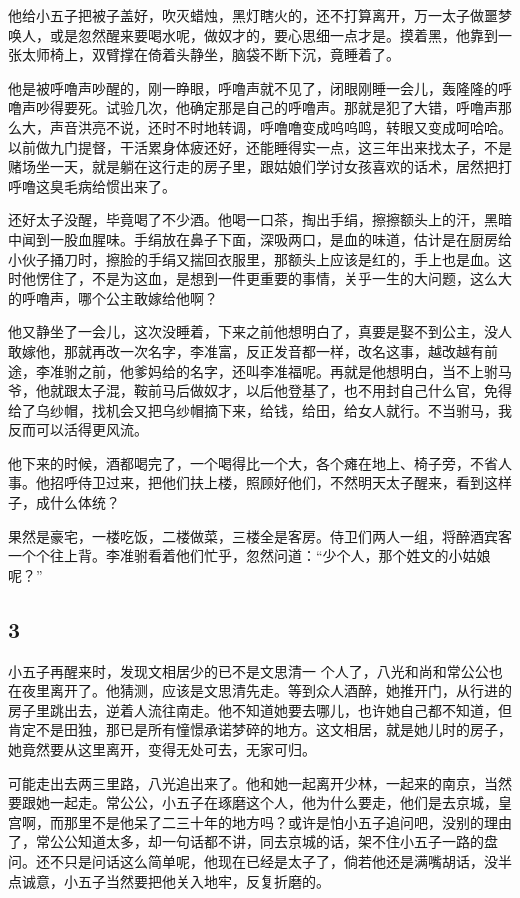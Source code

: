 他给小五子把被子盖好，吹灭蜡烛，黑灯瞎火的，还不打算离开，万一太子做噩梦唤人，或是忽然醒来要喝水呢，做奴才的，要心思细一点才是。摸着黑，他靠到一张太师椅上，双臂撑在倚着头静坐，脑袋不断下沉，竟睡着了。

他是被呼噜声吵醒的，刚一睁眼，呼噜声就不见了，闭眼刚睡一会儿，轰隆隆的呼噜声吵得要死。试验几次，他确定那是自己的呼噜声。那就是犯了大错，呼噜声那么大，声音洪亮不说，还时不时地转调，呼噜噜变成呜呜鸣，转眼又变成呵哈哈。以前做九门提督，干活累身体疲还好，还能睡得实一点，这三年出来找太子，不是赌场坐一天，就是躺在这行走的房子里，跟姑娘们学讨女孩喜欢的话术，居然把打呼噜这臭毛病给惯出来了。

还好太子没醒，毕竟喝了不少酒。他喝一口茶，掏出手绢，擦擦额头上的汗，黑暗中闻到一股血腥味。手绢放在鼻子下面，深吸两口，是血的味道，估计是在厨房给小伙子捅刀时，擦脸的手绢又揣回衣服里，那额头上应该是红的，手上也是血。这时他愣住了，不是为这血，是想到一件更重要的事情，关乎一生的大问题，这么大的呼噜声，哪个公主敢嫁给他啊？

他又静坐了一会儿，这次没睡着，下来之前他想明白了，真要是娶不到公主，没人敢嫁他，那就再改一次名字，李准富，反正发音都一样，改名这事，越改越有前途，李准驸之前，他爹妈给的名字，还叫李准福呢。再就是他想明白，当不上驸马爷，他就跟太子混，鞍前马后做奴才，以后他登基了，也不用封自己什么官，免得给了乌纱帽，找机会又把乌纱帽摘下来，给钱，给田，给女人就行。不当驸马，我反而可以活得更风流。

他下来的时候，酒都喝完了，一个喝得比一个大，各个瘫在地上、椅子旁，不省人事。他招呼侍卫过来，把他们扶上楼，照顾好他们，不然明天太子醒来，看到这样子，成什么体统？

果然是豪宅，一楼吃饭，二楼做菜，三楼全是客房。侍卫们两人一组，将醉酒宾客一个个往上背。李准驸看着他们忙乎，忽然问道：“少个人，那个姓文的小姑娘呢？”
\newline

{\centering\subsection{3}}

小五子再醒来时，发现文相居少的已不是文思清一
个人了，八光和尚和常公公也在夜里离开了。他猜测，应该是文思清先走。等到众人酒醉，她推开门，从行进的房子里跳出去，逆着人流往南走。他不知道她要去哪儿，也许她自己都不知道，但肯定不是田独，那已是所有憧憬承诺梦碎的地方。这文相居，就是她儿时的房子，她竟然要从这里离开，变得无处可去，无家可归。

可能走出去两三里路，八光追出来了。他和她一起离开少林，一起来的南京，当然要跟她一起走。常公公，小五子在琢磨这个人，他为什么要走，他们是去京城，皇宫啊，而那里不是他呆了二三十年的地方吗？或许是怕小五子追问吧，没别的理由了，常公公知道太多，却一句话都不讲，同去京城的话，架不住小五子一路的盘问。还不只是问话这么简单呢，他现在已经是太子了，倘若他还是满嘴胡话，没半点诚意，小五子当然要把他关入地牢，反复折磨的。

